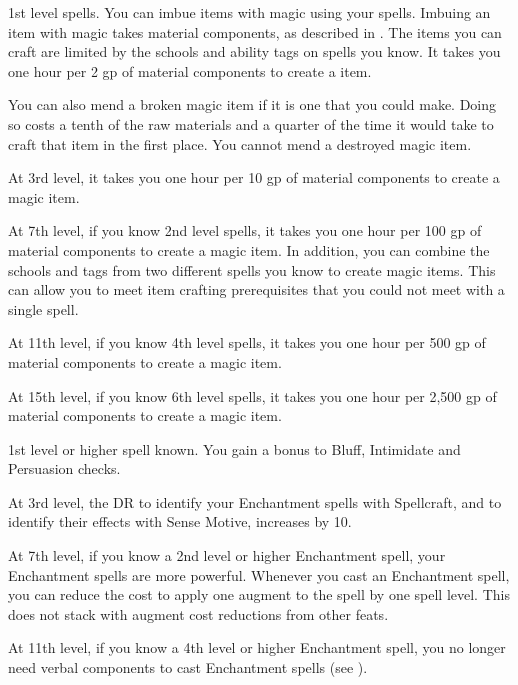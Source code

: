     \featpre 1st level spells.
    \featben You can imbue items with magic using your spells.
    Imbuing an item with magic takes material components, as described in .
    The items you can craft are limited by the schools and ability tags on spells you know.
    It takes you one hour per 2 gp of material components to create a item.

    You can also mend a broken magic item if it is one that you could make.
    Doing so costs a tenth of the raw materials and a quarter of the time it would take to craft that item in the first place.
    You cannot mend a destroyed magic item.

    At 3rd level, it takes you one hour per 10 gp of material components to create a magic item. %

    At 7th level, if you know 2nd level spells, it takes you one hour per 100 gp of material components to create a magic item. %
    In addition, you can combine the schools and tags from two different spells you know to create magic items.
    This can allow you to meet item crafting prerequisites that you could not meet with a single spell.

    At 11th level, if you know 4th level spells, it takes you one hour per 500 gp of material components to create a magic item. %

    At 15th level, if you know 6th level spells, it takes you one hour per 2,500 gp of material components to create a magic item. %

    \featpres 1st level or higher  spell known.
    \featben You gain a  bonus to Bluff, Intimidate and Persuasion checks.

    At 3rd level, the DR to identify your Enchantment spells with Spellcraft, and to identify their effects with Sense Motive, increases by 10.

    At 7th level, if you know a 2nd level or higher Enchantment spell, your Enchantment spells are more powerful.
    Whenever you cast an Enchantment spell, you can reduce the cost to apply one augment to the spell by one spell level.
    This does not stack with augment cost reductions from other feats.

    At 11th level, if you know a 4th level or higher Enchantment spell, you no longer need verbal components to cast Enchantment spells (see ).

